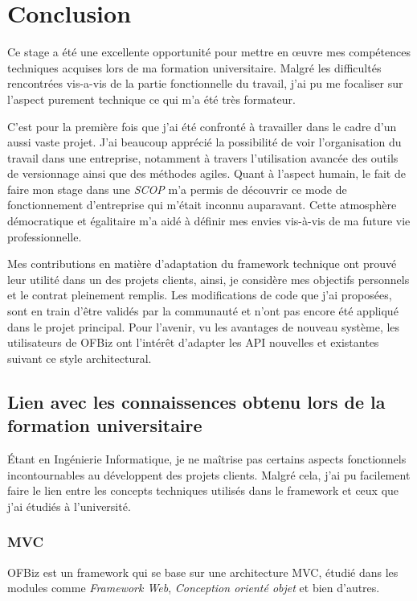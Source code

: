 \chapter{Conclusion}
Ce stage a été une excellente opportunité pour mettre en œuvre mes compétences techniques acquises lors de ma formation universitaire. Malgré les difficultés rencontrées vis-a-vis de la partie fonctionnelle du travail, j'ai pu me focaliser sur l'aspect purement technique ce qui m'a été très formateur. 

C'est pour la première fois que j'ai été confronté à travailler dans le cadre d'un aussi vaste projet. J'ai beaucoup apprécié la possibilité de voir l'organisation du travail dans une entreprise, notamment à travers l'utilisation avancée des outils de versionnage ainsi que des méthodes agiles. Quant à l'aspect humain, le fait de faire mon stage dans une \emph{SCOP} m'a permis de découvrir ce mode de fonctionnement d'entreprise qui m'était inconnu auparavant. Cette atmosphère démocratique et égalitaire m'a aidé à définir mes envies vis-à-vis de ma future vie professionnelle.

Mes contributions en matière d'adaptation du framework technique ont prouvé leur utilité dans un des projets clients, ainsi, je considère mes objectifs personnels et le contrat pleinement remplis. Les modifications de code que j'ai proposées, sont en train d'être validés par la communauté et n'ont pas encore été appliqué dans le projet principal.
Pour l'avenir, vu les avantages de nouveau système, les utilisateurs de OFBiz ont l'intérêt d'adapter les API nouvelles et existantes suivant ce style architectural.



\section{Lien avec les connaissences obtenu lors de la formation universitaire}
Étant en Ingénierie Informatique, je ne maîtrise pas certains aspects fonctionnels incontournables au développent des projets clients. Malgré cela, j'ai pu facilement faire le lien entre les concepts techniques utilisés dans le framework et ceux que j'ai étudiés à l'université. 
\subsection{MVC}
OFBiz est un framework qui se base sur une architecture MVC, étudié dans les modules comme \emph{Framework Web}, \emph{Conception orienté objet} et bien d'autres. 
